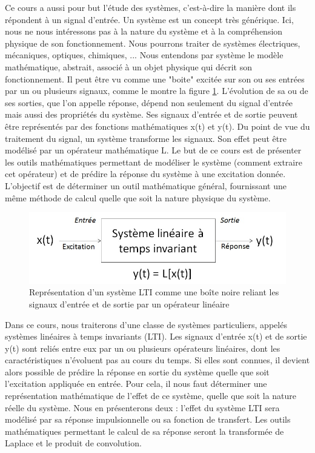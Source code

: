 	Ce cours a aussi pour but l'étude des systèmes, c'est-à-dire la manière dont ils répondent à un signal d'entrée. Un système est un concept très générique. Ici, nous ne nous intéressons pas à la nature du système et à la compréhension physique de son fonctionnement. Nous pourrons traiter de systèmes électriques, mécaniques, optiques, chimiques, ...	Nous entendons par système le modèle mathématique, abstrait, associé à un objet physique qui décrit son fonctionnement. Il peut être vu comme une "boite" excitée sur son ou ses entrées par un ou plusieurs signaux, comme le montre la figure \ref{Fig:LTI}. L'évolution de sa ou de ses sorties, que l'on appelle réponse, dépend non seulement du signal d'entrée mais aussi des propriétés du système. Ses signaux d'entrée et de sortie peuvent être représentés par des fonctions mathématiques x(t) et y(t). Du point de vue du traitement du signal, un système transforme les signaux. Son effet peut être modélisé par un opérateur mathématique L. Le but de ce cours est de présenter les outils mathématiques permettant de modéliser le système (comment extraire cet opérateur) et de prédire la réponse du système à une excitation donnée. L'objectif est de déterminer un outil mathématique général, fournissant une même méthode de calcul quelle que soit la nature physique du système.
	
	\begin{figure}[h!]
		\centering
		\includegraphics[scale=0.45]{images/LTI.jpg} 
		\caption{Représentation d'un système LTI comme une boîte noire reliant les signaux d'entrée et de sortie par un opérateur linéaire}	
		\label{Fig:LTI}
	\end{figure}


	Dans ce cours, nous traiterons d'une classe de systèmes particuliers, appelés systèmes linéaires à temps invariants (LTI). Les signaux d'entrée x(t) et de sortie y(t) sont reliés entre eux par un ou plusieurs opérateurs linéaires, dont les caractéristiques n'évoluent pas au cours du temps. Si elles sont connues, il devient alors possible de prédire la réponse en sortie du système quelle que soit l'excitation appliquée en entrée. Pour cela, il nous faut déterminer une représentation mathématique de l'effet de ce système, quelle que soit la nature réelle du système. Nous en présenterons deux : l'effet du système LTI sera modélisé par sa réponse impulsionnelle ou sa fonction de transfert. Les outils mathématiques permettant le calcul de sa réponse seront la transformée de Laplace et le produit de convolution.
	
